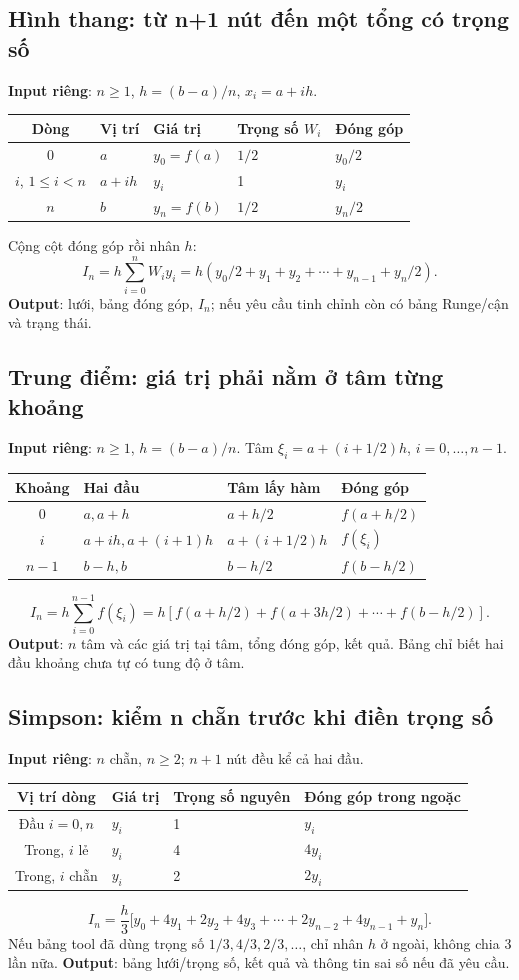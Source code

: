 \subsection{Hình thang: từ n+1 nút đến một tổng có trọng số}
\textbf{Input riêng}: $n\ge1$, $h=(b-a)/n$, $x_i=a+ih$.
\begin{center}\small\begin{tabular}{cllll}\toprule
Dòng&Vị trí&Giá trị&Trọng số $W_i$&Đóng góp\\\midrule
0&$a$&$y_0=f(a)$&$1/2$&$y_0/2$\\
$i$, $1\le i<n$&$a+ih$&$y_i$&1&$y_i$\\
$n$&$b$&$y_n=f(b)$&$1/2$&$y_n/2$\\\bottomrule
\end{tabular}\end{center}
Cộng cột đóng góp rồi nhân $h$:
\[
I_n=h\sum_{i=0}^nW_iy_i=h(y_0/2+y_1+y_2+\cdots+y_{n-1}+y_n/2).
\]
\textbf{Output}: lưới, bảng đóng góp, $I_n$; nếu yêu cầu tinh chỉnh còn có bảng Runge/cận và trạng thái.

\subsection{Trung điểm: giá trị phải nằm ở tâm từng khoảng}
\textbf{Input riêng}: $n\ge1$, $h=(b-a)/n$. Tâm $\xi_i=a+(i+1/2)h$, $i=0,\ldots,n-1$.
\begin{center}\small\begin{tabular}{clll}\toprule
Khoảng&Hai đầu&Tâm lấy hàm&Đóng góp\\\midrule
0&$a,a+h$&$a+h/2$&$f(a+h/2)$\\
$i$&$a+ih,a+(i+1)h$&$a+(i+1/2)h$&$f(\xi_i)$\\
$n-1$&$b-h,b$&$b-h/2$&$f(b-h/2)$\\\bottomrule
\end{tabular}\end{center}
\[
I_n=h\sum_{i=0}^{n-1}f(\xi_i)=h[f(a+h/2)+f(a+3h/2)+\cdots+f(b-h/2)].
\]
\textbf{Output}: $n$ tâm và các giá trị tại tâm, tổng đóng góp, kết quả. Bảng chỉ biết hai đầu khoảng chưa tự có tung độ ở tâm.

\subsection{Simpson: kiểm n chẵn trước khi điền trọng số}
\textbf{Input riêng}: $n$ chẵn, $n\ge2$; $n+1$ nút đều kể cả hai đầu.
\begin{center}\small\begin{tabular}{clll}\toprule
Vị trí dòng&Giá trị&Trọng số nguyên&Đóng góp trong ngoặc\\\midrule
Đầu $i=0,n$&$y_i$&1&$y_i$\\
Trong, $i$ lẻ&$y_i$&4&$4y_i$\\
Trong, $i$ chẵn&$y_i$&2&$2y_i$\\\bottomrule
\end{tabular}\end{center}
\[
I_n=\frac h3\big[y_0+4y_1+2y_2+4y_3+\cdots+2y_{n-2}+4y_{n-1}+y_n\big].
\]
Nếu bảng tool đã dùng trọng số $1/3,4/3,2/3,\ldots$, chỉ nhân $h$ ở ngoài, không chia 3 lần nữa. \textbf{Output}: bảng lưới/trọng số, kết quả và thông tin sai số nếu đã yêu cầu.

